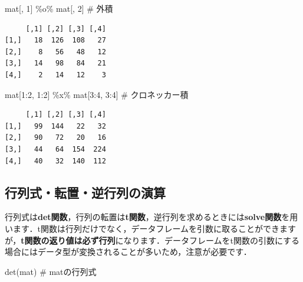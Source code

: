 \documentclass[
  letterpaper,
  DIV=11,
  numbers=noendperiod]{scrreprt}
\newenvironment{Shaded}{\begin{snugshade}}{\end{snugshade}}
\newcommand{\CommentTok}[1]{\textcolor[rgb]{0.37,0.37,0.37}{#1}}
\newcommand{\DecValTok}[1]{\textcolor[rgb]{0.68,0.00,0.00}{#1}}
\newcommand{\FunctionTok}[1]{\textcolor[rgb]{0.28,0.35,0.67}{#1}}
\newcommand{\NormalTok}[1]{\textcolor[rgb]{0.00,0.23,0.31}{#1}}
\newcommand{\SpecialCharTok}[1]{\textcolor[rgb]{0.37,0.37,0.37}{#1}}
\begin{document}
\begin{Shaded}
\begin{Highlighting}[]
\NormalTok{mat[, }\DecValTok{1}\NormalTok{] }\SpecialCharTok{\%o\%}\NormalTok{ mat[, }\DecValTok{2}\NormalTok{] }\CommentTok{\# 外積}
\end{Highlighting}
\end{Shaded}

\begin{verbatim}
     [,1] [,2] [,3] [,4]
[1,]   18  126  108   27
[2,]    8   56   48   12
[3,]   14   98   84   21
[4,]    2   14   12    3
\end{verbatim}

\begin{Shaded}
\begin{Highlighting}[]
\NormalTok{mat[}\DecValTok{1}\SpecialCharTok{:}\DecValTok{2}\NormalTok{, }\DecValTok{1}\SpecialCharTok{:}\DecValTok{2}\NormalTok{] }\SpecialCharTok{\%x\%}\NormalTok{ mat[}\DecValTok{3}\SpecialCharTok{:}\DecValTok{4}\NormalTok{, }\DecValTok{3}\SpecialCharTok{:}\DecValTok{4}\NormalTok{] }\CommentTok{\# クロネッカー積}
\end{Highlighting}
\end{Shaded}

\begin{verbatim}
     [,1] [,2] [,3] [,4]
[1,]   99  144   22   32
[2,]   90   72   20   16
[3,]   44   64  154  224
[4,]   40   32  140  112
\end{verbatim}

\hypertarget{ux884cux5217ux5f0fux8ee2ux7f6eux9006ux884cux5217ux306eux6f14ux7b97}{%
\subsection{行列式・転置・逆行列の演算}\label{ux884cux5217ux5f0fux8ee2ux7f6eux9006ux884cux5217ux306eux6f14ux7b97}}

行列式は\textbf{det関数}，行列の転置は\textbf{t関数}，逆行列を求めるときには\textbf{solve関数}を用います．t関数は行列だけでなく，データフレームを引数に取ることができますが，\textbf{t関数の返り値は必ず行列}になります．データフレームをt関数の引数にする場合にはデータ型が変換されることが多いため，注意が必要です．

\begin{Shaded}
\begin{Highlighting}[]
\FunctionTok{det}\NormalTok{(mat) }\CommentTok{\# matの行列式}
\end{Highlighting}
\end{Shaded}
\end{document}
